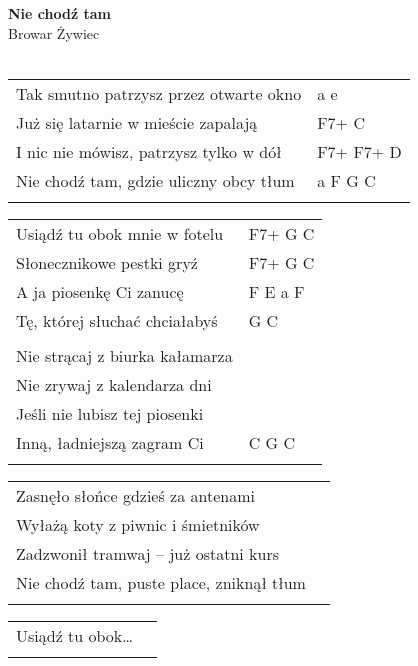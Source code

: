 \documentclass[a5paper]{article}
\begin{document}


\noindent
\fontsize{12pt}{15pt}\selectfont
\textbf{Nie chodź tam} \\
\fontsize{8pt}{10pt}\selectfont
Browar Żywiec \\ \\
\fontsize{10pt}{12pt}\selectfont
{}
\begin{tabular}{@{}p{8.50cm}p{3cm}@{}}
\noindent
Tak smutno patrzysz przez otwarte okno & a e \\
Już się latarnie w mieście zapalają	& F7+ C \\
I nic nie mówisz, patrzysz tylko w dół & F7+ F7+ D \\
Nie chodź tam, gdzie uliczny obcy tłum & a F G C \\ \\
\end{tabular}

\noindent
\begin{tabular}{@{}p{7.50cm}p{3cm}@{}}
Usiądź tu obok mnie w fotelu & F7+ G C \\
Słonecznikowe pestki gryź & F7+ G C \\
A ja piosenkę Ci zanucę & F E a F \\
Tę, której słuchać chciałabyś & G C \\ \\
 
Nie strącaj z biurka kałamarza \\
Nie zrywaj z kalendarza dni \\
Jeśli nie lubisz tej piosenki \\
Inną, ładniejszą zagram Ci & C G C \\ \\
\end{tabular}

\noindent
\begin{tabular}{@{}p{8.50cm}p{3cm}@{}} 
Zasnęło słońce gdzieś za antenami \\
Wyłażą koty z piwnic i śmietników \\
Zadzwonił tramwaj – już ostatni kurs \\
Nie chodź tam, puste place, zniknął tłum \\ \\
\end{tabular}

\noindent
\begin{tabular}{@{}p{7.50cm}p{3cm}@{}}
Usiądź tu obok… \\ \\
\end{tabular}
\end{document}
